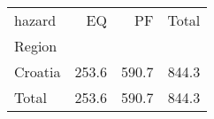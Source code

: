 \begin{tabular}{lrrr}
\toprule
hazard &     EQ &     PF &  Total \\
Region  &        &        &        \\
\midrule
Croatia &  253.6 &  590.7 &  844.3 \\
Total   &  253.6 &  590.7 &  844.3 \\
\bottomrule
\end{tabular}
